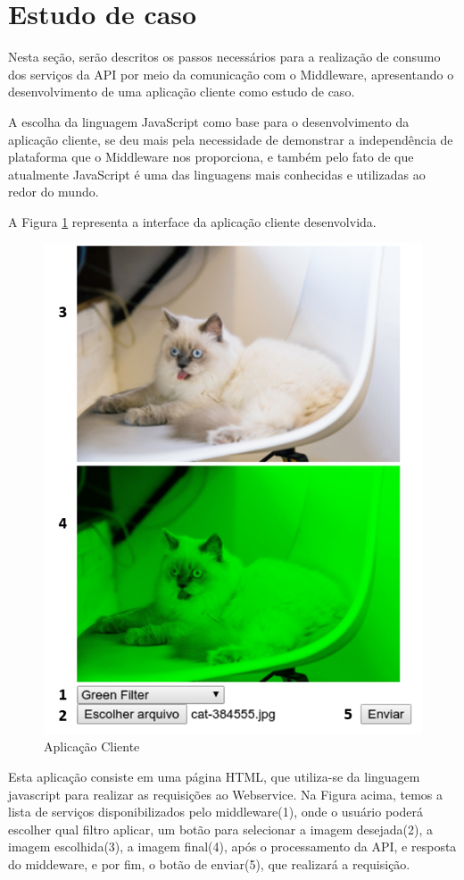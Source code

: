 \documentclass[12pt]{article}
\begin{document}
\section{Estudo de caso}

Nesta seção, serão descritos os passos necessários para a realização de consumo dos serviços da API por meio da comunicação com o Middleware, apresentando o desenvolvimento de uma aplicação cliente como estudo de caso.

A escolha da linguagem JavaScript como base para o desenvolvimento da aplicação cliente, se deu mais pela necessidade de demonstrar a independência de plataforma que o Middleware nos proporciona, e também pelo fato de que atualmente JavaScript é uma das linguagens mais conhecidas e utilizadas ao redor do mundo.

A Figura \ref{fig:Figura6} representa a interface da aplicação cliente desenvolvida.

\begin{figure}[ht]
	\centering
	\includegraphics[width=.7\textwidth]{aplicacao-cliente.png}
	\caption{Aplicação Cliente}
	\label{fig:Figura6}
\end{figure}

Esta aplicação consiste em uma página HTML, que utiliza-se da linguagem javascript para realizar as requisições ao Webservice. Na Figura acima, temos a lista de serviços disponibilizados pelo middleware(1), onde o usuário poderá escolher qual filtro aplicar, um botão para selecionar a imagem desejada(2), a imagem escolhida(3), a imagem final(4), após o processamento da API, e resposta do middeware, e por fim, o botão de enviar(5), que realizará a requisição.
\end{document}
